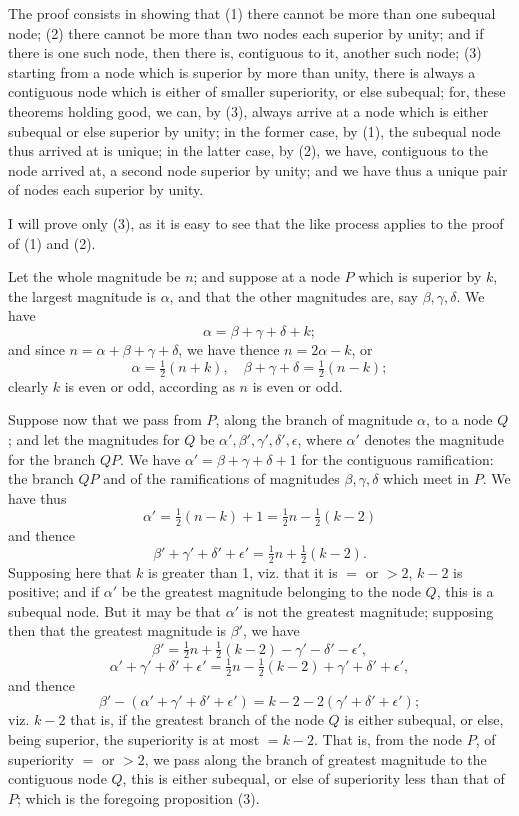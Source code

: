 \documentclass[11pt,a4paper]{book}
\begin{document}
\begin{solution}
The proof consists in showing that (1) there cannot be more than one subequal node; (2) there cannot be more than two nodes each superior by unity; and if there is one such node, then there is, contiguous to it, another such node; (3) starting from a node which is superior by more than unity, there is always a contiguous node which is either of smaller superiority, or else subequal; for, these theorems holding good, we can, by (3), always arrive at a node which is either subequal or else superior by unity; in the former case, by (1), the subequal node thus arrived at is unique; in the latter case, by (2), we have, contiguous to the node arrived at, a second node superior by unity; and we have thus a unique pair of nodes each superior by unity.

I will prove only (3), as it is easy to see that the like process applies to the proof of (1) and (2).

Let the whole magnitude be $n$; and suppose at a node $P$ which is superior by $k$, the largest magnitude is $\alpha$, and that the other magnitudes are, say $\beta, \gamma, \delta$. We have
\[
\alpha = \beta + \gamma + \delta + k;
\]
and since $n = \alpha + \beta + \gamma + \delta$, we have thence $n = 2\alpha - k$, or
\[
\alpha = \tfrac{1}{2}(n+k), \quad \beta + \gamma + \delta = \tfrac{1}{2}(n-k);
\]
clearly $k$ is even or odd, according as $n$ is even or odd.

Suppose now that we pass from $P$, along the branch of magnitude $\alpha$, to a node $Q$; and let the magnitudes for $Q$ be $\alpha', \beta', \gamma', \delta', \epsilon$, where $\alpha'$ denotes the magnitude for the branch $QP$. We have $\alpha' = \beta + \gamma + \delta + 1$ for the contiguous ramification: the branch $QP$ and of the ramifications of magnitudes $\beta, \gamma, \delta$ which meet in $P$. We have thus
\[
\alpha' = \tfrac{1}{2}(n-k) + 1 = \tfrac{1}{2}n - \tfrac{1}{2}(k-2)
\]
and thence
\[
\beta' + \gamma' + \delta' + \epsilon' = \tfrac{1}{2}n + \tfrac{1}{2}(k-2).
\]
Supposing here that $k$ is greater than 1, viz. that it is $=$ or $> 2$, $k-2$ is positive; and if $\alpha'$ be the greatest magnitude belonging to the node $Q$, this is a subequal node. But it may be that $\alpha'$ is not the greatest magnitude; supposing then that the greatest magnitude is $\beta'$, we have
\[
\beta' = \tfrac{1}{2}n + \tfrac{1}{2}(k-2) - \gamma' - \delta' - \epsilon',
\]
\[
\alpha' + \gamma' + \delta' + \epsilon' = \tfrac{1}{2}n - \tfrac{1}{2}(k-2) + \gamma' + \delta' + \epsilon',
\]
and thence
\[
\beta' - (\alpha' + \gamma' + \delta' + \epsilon') = k-2 - 2(\gamma' + \delta' + \epsilon');
\]
viz. $k-2$ that is, if the greatest branch of the node $Q$ is either subequal, or else, being superior, the superiority is at most $= k-2$. That is, from the node $P$, of superiority $=$ or $> 2$, we pass along the branch of greatest magnitude to the contiguous node $Q$, this is either subequal, or else of superiority less than that of $P$; which is the foregoing proposition (3).


\end{solution}
\end{document}
